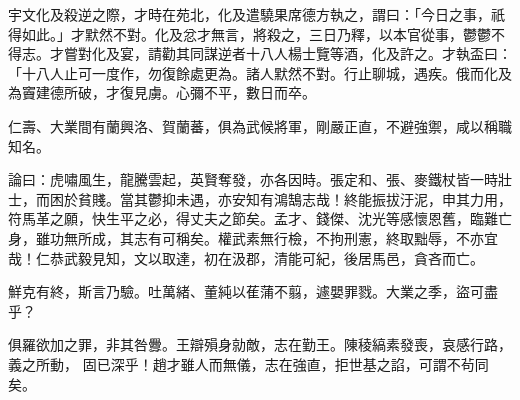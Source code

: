 \begin{pinyinscope}
 宇文化及殺逆之際，才時在苑北，化及遣驍果席德方執之，謂曰：「今日之事，祇得如此。」才默然不對。化及忿才無言，將殺之，三日乃釋，以本官從事，鬱鬱不得志。才嘗對化及宴，請勸其同謀逆者十八人楊士覽等酒，化及許之。才執盃曰：「十八人止可一度作，勿復餘處更為。諸人默然不對。行止聊城，遇疾。俄而化及為竇建德所破，才復見虜。心彌不平，數日而卒。



 仁壽、大業間有蘭興洛、賀蘭蕃，俱為武候將軍，剛嚴正直，不避強禦，咸以稱職知名。



 論曰：虎嘯風生，龍騰雲起，英賢奪發，亦各因時。張定和、張、麥鐵杖皆一時壯士，而困於貧賤。當其鬱抑未遇，亦安知有鴻鵠志哉！終能振拔汙泥，申其力用，符馬革之願，快生平之必，得丈夫之節矣。孟才、錢傑、沈光等感懷恩舊，臨難亡身，雖功無所成，其志有可稱矣。權武素無行檢，不拘刑憲，終取黜辱，不亦宜哉！仁恭武毅見知，文以取達，初在汲郡，清能可紀，後居馬邑，貪吝而亡。



 鮮克有終，斯言乃驗。吐萬緒、董純以萑蒲不翦，遽嬰罪戮。大業之季，盜可盡乎？



 俱羅欲加之罪，非其咎釁。王辯殞身勍敵，志在勤王。陳稜縞素發喪，哀感行路，義之所動，
 固已深乎！趙才雖人而無儀，志在強直，拒世基之諂，可謂不茍同矣。



\end{pinyinscope}
